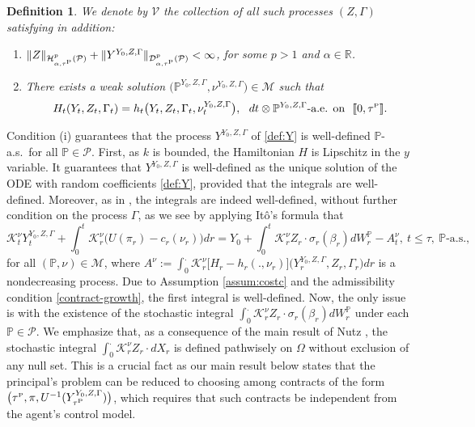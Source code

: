 \documentclass[11pt,a4paper]{article}
\numberwithin{equation}{section}
\def\dbP{\mathbb{P}}
\def\dbR{\mathbb{R}}
\newcommand{\cD}{\mathcal{D}}
\newcommand{\cH}{\mathcal{H}}
\newcommand{\cK}{\mathcal{K}}
\newcommand{\cM}{\mathcal{M}}
\newcommand{\cP}{\mathcal{P}}
\newcommand{\cV}{\mathcal{V}}
\def\t {\tau}
\newtheorem{definition}[theorem]{Definition}
\theoremstyle{definition}
\begin{document}
\begin{definition} \label{def:V}
We denote by $\cV$ the collection of all such processes $(Z,\Gamma)$ satisfying in addition:
 \begin{enumerate}[{\rm (i)}]
  \item $\|Z\|_{\cH^p_{\alpha,\tau^{\scriptscriptstyle\rm P}}(\cP)} 
            + \|Y^{Y_0,Z,\Gamma}\|_{\cD^p_{\alpha,\tau^{\scriptscriptstyle\rm P}}(\cP)}<\infty$, for some $p>1$ and $\alpha\in\dbR$.
  \item There exists a weak solution $\big(\dbP^{Y_0,Z,\Gamma},\nu^{Y_0,Z,\Gamma}\big)\in\cM$ such that
         \begin{equation} \label{subgrad}
           H_t(Y_t,Z_t,\Gamma_t) = h_t\big(Y_t,Z_t,\Gamma_t,\nu^{Y_0,Z,\Gamma}_t\big),
           ~~dt\otimes\dbP^{Y_0,Z,\Gamma}\mbox{-a.e. on}~~
           \llbracket 0,\t^{\scriptscriptstyle\rm P}\rrbracket.
         \end{equation} 
 \end{enumerate}
\end{definition}


Condition (i) guarantees that the process $Y^{Y_0,Z,\Gamma}$ of \eqref{def:Y} is well-defined $\dbP$-a.s.~for all $\dbP\in\cP$. 
First, as $k$ is bounded, the Hamiltonian $H$ is Lipschitz in the $y$ variable. 
It guarantees that $Y^{Y_0,Z,\Gamma}$ is well-defined as the unique solution of the ODE with random coefficients \eqref{def:Y}, provided that the integrals are well-defined. 
Moreover, as in \cite{CPT18}, the integrals are indeed well-defined, without further condition on the process $\Gamma$, as we see by applying It\^o's formula that 
  \begin{equation} \label{YZK}
   \cK^{\nu}_tY^{Y_0,Z,\Gamma}_t + \int_0^t \cK^{\nu}_r\big(U(\pi_r) - c_r(\nu_r)\big)dr = Y_0 + \int_0^t \cK^{\nu}_rZ_r\cdot\sigma_r(\beta_r)dW^\dbP_r-A^\nu_t, ~t\leq\tau,~\dbP\mbox{-a.s.}, 
  \end{equation}
  for all $(\dbP,\nu)\in\cM$, where $A^\nu:= \int_0^. \cK^{\nu}_r\big[H_r-h_r(.,\nu_r)\big]\big(Y_r^{Y_0,Z,\Gamma},Z_r,\Gamma_r\big)dr$ is a nondecreasing process. 
  Due to Assumption \ref{assum:costc} and the admissibility condition \eqref{contract-growth}, the first integral is well-defined. 
  Now, the only issue is with the existence of the stochastic integral $\int_0^.\cK_r^\nu Z_r\cdot\sigma_r(\beta_r)dW^\dbP_r$ under each $\dbP\in\cP$. 
We emphasize that, as a consequence of the main result of Nutz \cite{Nut12}, the stochastic integral $\int_0^.\cK_r^\nu Z_r\cdot dX_r$ is defined pathwisely on $\Omega$ without exclusion of any null set. 
This is a crucial fact as our main result below states that the principal's problem can be reduced to choosing among contracts of the form $\big(\tau^{\scriptscriptstyle\rm P},\pi,U^{-1}(Y^{Y_0,Z,\Gamma}_{\tau^{\scriptscriptstyle\rm P}})\big)$, 
   which requires that such contracts be independent from the agent's control model.
\end{document}
